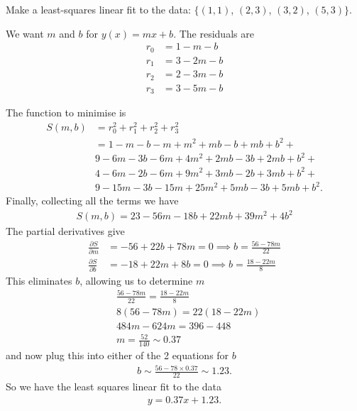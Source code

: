 \exemple{\upline}
{
	Make a least-squares linear fit to the data: $\{ (1,1)$, $(2,3)$, $(3,2)$, $(5,3) \}$.
	
	\noindent We want $m$ and $b$ for $y(x) = mx + b$. The residuals are
	\begin{align*}
	r_0 &= 1 - m - b \\
	r_1 &= 3 - 2m - b \\
	r_2 &= 2 - 3m - b \\
	r_3 &= 3 - 5m - b
	\end{align*}
	
	The function to minimise is
	\begin{align*}
	S(m,b) &= r_0^2 + r_1^2 + r_2^2 + r_3^2\\
	&= 1 -   m -  b -   m +   m^2 +  mb -  b +  mb + b^2 + \\
	&  9 -  6m - 3b -  6m +  4m^2 + 2mb - 3b + 2mb + b^2 + \\
	&  4 -  6m - 2b -  6m +  9m^2 + 3mb - 2b + 3mb + b^2 + \\
	&  9 - 15m - 3b - 15m + 25m^2 + 5mb - 3b + 5mb + b^2.
	\end{align*}
	Finally, collecting all the terms we have
	\begin{align*}
	\boxed{S(m,b) = 23 - 56m -18b + 22mb + 39m^2 + 4b^2}
	\end{align*}
	The partial derivatives give
	\begin{align*}
	\frac{\partial S}{\partial m} &= -56 +22b + 78m = 0 \implies b=\frac{56-78m}{22} \\
	\frac{\partial S}{\partial b} &= -18 +22m + 8b = 0  \implies b=\frac{18-22m}{8}
	\end{align*}
	This eliminates $b$, allowing us to determine $m$
	\begin{align*}
	& \frac{56-78m}{22} = \frac{18-22m}{8} \\
	& 8(56 - 78m) = 22(18-22m)\\
	& 484m - 624m = 396 - 448 \\
	& m = \frac{52}{140} \sim 0.37
	\end{align*}
	and now plug this into either of the 2 equations for $b$
	\begin{align*}
	b \sim \frac{56-78\times 0.37}{22} \sim 1.23.
	\end{align*}
	So we have the least squares linear fit to the data
	\begin{align*}
	y = 0.37 x + 1.23.
	\end{align*}
}{\downline}

